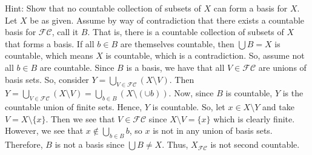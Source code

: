 \documentclass[12pt]{article}
\begin{document}
\begin{enumerate}
\begin{enumerate}
Hint: Show that no countable collection of subsets of $X$ can form a basis for $X$.\\

Let $X$ be as given. Assume by way of contradiction that there exists a countable basis for $\mathcal{FC}$, call it $B$. That is, there is a countable collection of subsets of $X$ that forms a basis. If all $b\in B$ are themselves countable, then $\bigcup B=X$ is countable, which means $X$ is countable, which is a contradiction. So, assume not all $b\in B$ are countable. Since $B$ is a basis, we have that all $V\in\mathcal{FC}$ are unions of basis sets. So, consider $Y=\bigcup_{V\in\mathcal{FC}}(X\setminus V)$. Then $Y=\bigcup_{V\in\mathcal{FC}}(X\setminus V)=\bigcup_{b\in B}(X\setminus(\cup b))$. Now, since $B$ is countable, $Y$ is the countable union of finite sets. Hence, $Y$ is countable. So, let $x\in X\setminus Y$ and take $V=X\setminus\{x\}$. Then we see that $V\in\mathcal{FC}$ since $X\setminus V=\{x\}$ which is clearly finite. However, we see that $x\notin\bigcup_{b\in B}b$, so $x$ is not in any union of basis sets. Therefore, $B$ is not a basis since $\bigcup B\neq X$. Thus, $X_{\mathcal{FC}}$ is not second countable.
\end{enumerate}
\end{enumerate}
\end{document}
